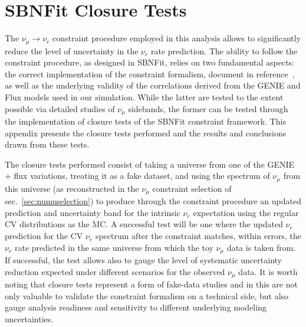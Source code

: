 \documentclass[a4paper]{article}
\begin{document}
\newpage

\section{SBNFit Closure Tests}
\label{app:closure}
\par The $\nu_{\mu} \rightarrow \nu_e$ constraint procedure employed in this analysis allows to significantly reduce the level of uncertainty in the $\nu_e$ rate prediction. The ability to follow the constraint procedure, as designed in SBNFit, relies on two fundamental aspects: the correct implementation of the constraint formalism, document in reference~\cite{bib:muonconstraint}, as well as the underlying validity of the correlations derived from the GENIE and Flux models used in our simulation. While the latter are tested to the extent possible via detailed studies of $\nu_{\mu}$ sidebands, the former can be tested through the implementation of closure tests of the SBNFit constraint framework. This appendix presents the closure tests performed and the results and conclusions drawn from these tests. 
\par The closure tests performed consist of taking a universe from one of the GENIE + flux variations, treating it as a fake dataset, and using the spectrum of $\nu_{\mu}$ from this universe (as reconstructed in the $\nu_{\mu}$ constraint selection of sec.~\ref{sec:numuselection}) to produce through the constraint procedure an updated prediction and uncertainty band for the intrinsic $\nu_e$ expectation using the regular CV distributions as the MC. A successful test will be one where the updated $\nu_e$ prediction for the CV $\nu_e$ spectrum after the constraint matches, within errors, the $\nu_e$ rate predicted in the same universe from which the toy $\nu_{\mu}$ data is taken from. If successful, the test allows also to gauge the level of systematic uncertainty reduction expected under different scenarios for the observed $\nu_{\mu}$ data.
It is worth noting that closure tests represent a form of fake-data studies and in this are not only valuable to validate the constraint formalism on a technical side, but also gauge analysis readiness and sensitivity to different underlying modeling uncertainties.
\end{document}

